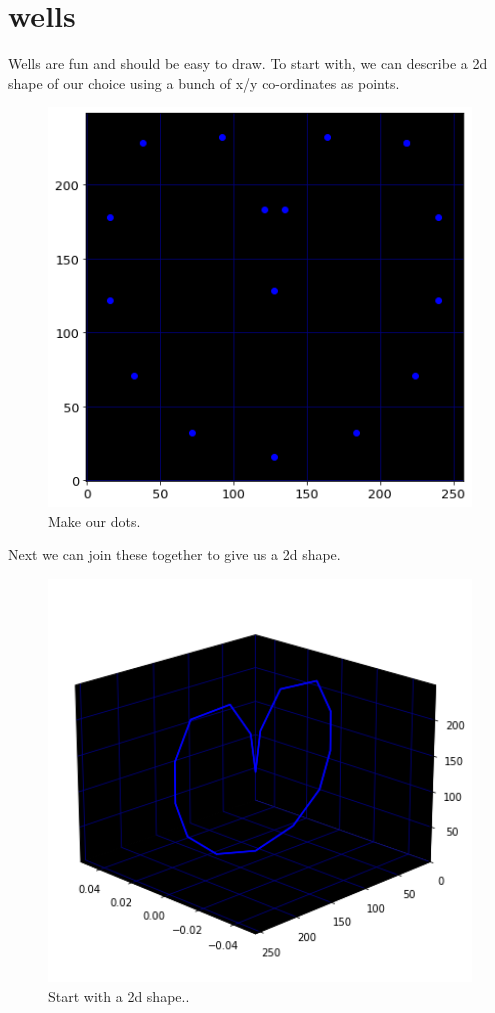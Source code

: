 \chapter{wells}
\label{sec:wells}
\lhead[tempest]{}
\lstset{style=6502Style}

Wells are fun and should be easy to draw. To start with, we can describe a 2d shape
of our choice using a bunch of x/y co-ordinates as points.
\begin{figure}[H]
    \centering
    \begin{adjustbox}{width=7cm,center}
      \includegraphics[width=12cm]{src/wells/HEART_dots_no_title.png}%
    \end{adjustbox}
  \caption{Make our dots.}
\end{figure}

Next we can join these together to give us a 2d shape.
\begin{figure}[H]
    \centering
    \begin{adjustbox}{width=8cm,center}
      \includegraphics[width=12cm]{src/wells/HEART_2d.png}%
    \end{adjustbox}
  \caption{Start with a 2d shape..}
\end{figure}

